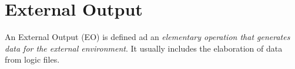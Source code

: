 \section{External Output}
An External Output (EO) is defined ad an \emph{elementary operation that generates data for the external environment}. It usually includes the elaboration of data from logic files.
